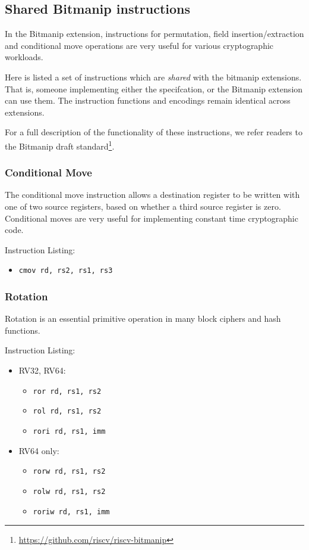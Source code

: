 \subsection{Shared Bitmanip instructions}
\label{sec:spec:shared:bitmanip}

In the Bitmanip extension, instructions for permutation, field
insertion/extraction and conditional move operations are very
useful for various cryptographic workloads.

Here is listed a set of instructions which are {\em shared} with
the bitmanip extensions.
That is, someone implementing either the \XCRYPTO specifcation, or
the Bitmanip extension can use them.
The instruction functions and encodings remain identical across extensions.

For a full description of the functionality of these instructions, we
refer readers to the Bitmanip draft standard\footnote{
\url{https://github.com/riscv/riscv-bitmanip}
}.

\subsubsection{Conditional Move}
The conditional move instruction allows a destination register to
be written with one of two source registers, based on whether a
third source register is zero.
Conditional moves are very useful for implementing constant time
cryptographic code.

Instruction Listing:
\begin{itemize}
\item {\tt cmov rd, rs2, rs1, rs3}
\end{itemize}

\subsubsection{Rotation}
Rotation is an essential primitive operation in many block ciphers and
hash functions.

Instruction Listing:
\begin{itemize}
\item RV32, RV64:
\begin{itemize}
\item {\tt ror  rd, rs1, rs2}
\item {\tt rol  rd, rs1, rs2}
\item {\tt rori rd, rs1, imm}
\end{itemize}
\item RV64 only:
\begin{itemize}
\item {\tt rorw  rd, rs1, rs2}
\item {\tt rolw  rd, rs1, rs2}
\item {\tt roriw rd, rs1, imm}
\end{itemize}
\end{itemize}

